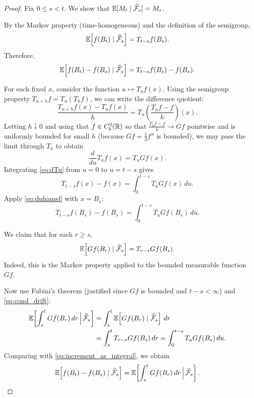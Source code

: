 \begin{proof}
Fix $0\le s<t$. We show that $\mathbb{E}[M_t\mid \widehat{\mathcal F}_s]=M_s$.

\medskip
{}
By the Markov property (time-homogeneous) and the definition of the semigroup,
\[
\mathbb{E}\!\left[f(B_t)\mid \widehat{\mathcal F}_s\right]
=
T_{t-s}f(B_s).
\]
Therefore,
\begin{equation}\label{eq:increment_f}
\mathbb{E}\!\left[f(B_t)-f(B_s)\mid \widehat{\mathcal F}_s\right]
=
T_{t-s}f(B_s)-f(B_s).
\end{equation}

\medskip
{}
For each fixed $x$, consider the function $u\mapsto T_u f(x)$.
Using the semigroup property $T_{u+h}f = T_u(T_h f)$, we can write the difference quotient:
\[
\frac{T_{u+h}f(x)-T_u f(x)}{h}
=
T_u\left(\frac{T_h f - f}{h}\right)(x).
\]
Letting $h\downarrow0$ and using that $f\in C_b^2(\mathbb{R})$ so that
$\frac{T_h f - f}{h}\to Gf$ pointwise and is uniformly bounded for small $h$
(because $Gf=\tfrac12 f''$ is bounded), we may pass the limit through $T_u$ to obtain
\begin{equation}\label{eq:dTu}
\frac{d}{du}T_u f(x)=T_u Gf(x).
\end{equation}
Integrating \eqref{eq:dTu} from $u=0$ to $u=t-s$ gives
\begin{equation}\label{eq:duhamel}
T_{t-s}f(x)-f(x)=\int_0^{t-s} T_u Gf(x)\,du.
\end{equation}
Apply \eqref{eq:duhamel} with $x=B_s$:
\begin{equation}\label{eq:increment_as_integral}
T_{t-s}f(B_s)-f(B_s)=\int_0^{t-s} T_u Gf(B_s)\,du.
\end{equation}

\medskip
{}
We claim that for each $r\ge s$,
\begin{equation}\label{eq:cond_drift}
\mathbb{E}\!\left[Gf(B_r)\mid \widehat{\mathcal F}_s\right]=T_{r-s}Gf(B_s).
\end{equation}
Indeed, this is the Markov property applied to the bounded measurable function $Gf$.

Now use Fubini's theorem (justified since $Gf$ is bounded and $t-s<\infty$) and \eqref{eq:cond_drift}:
\begin{align*}
\mathbb{E}\!\left[\int_s^t Gf(B_r)\,dr \,\Big|\, \widehat{\mathcal F}_s\right]
&=\int_s^t \mathbb{E}\!\left[Gf(B_r)\mid \widehat{\mathcal F}_s\right]\,dr\\
&=\int_s^t T_{r-s}Gf(B_s)\,dr
=\int_0^{t-s} T_u Gf(B_s)\,du.
\end{align*}
Comparing with \eqref{eq:increment_as_integral}, we obtain
\begin{equation}\label{eq:key_cancel}
\mathbb{E}\!\left[f(B_t)-f(B_s)\mid \widehat{\mathcal F}_s\right]
=
\mathbb{E}\!\left[\int_s^t Gf(B_r)\,dr \,\Big|\, \widehat{\mathcal F}_s\right].
\end{equation}


\end{proof}
